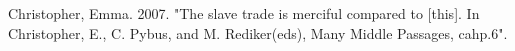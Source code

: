 \documentclass[10pt, a4paper]{ctexart} %
\begin{document}



\small
\begin{thebibliography}{99}
	\setlength{\parskip}{0pt} %
	Christopher, Emma. 2007. "The slave trade is merciful compared to [this]. In Christopher, E., C. Pybus, and M. Rediker(eds), Many Middle Passages, cahp.6".
	\end {thebibliography}
\end{document}
